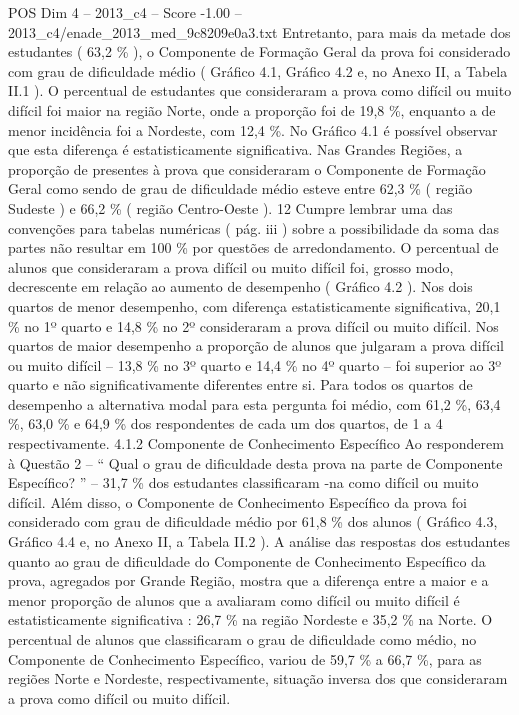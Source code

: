 \begin{textsample}{POS Dim 4 – 2013\_c4 – Score -1.00 – 2013\_c4/enade\_2013\_med\_9c8209e0a3.txt}
Entretanto, para mais da metade dos estudantes ( 63,2 \% ), o Componente de Formação Geral da prova foi considerado com grau de dificuldade médio ( Gráfico 4.1, Gráfico 4.2 e, no Anexo II, a Tabela II.1 ).
O percentual de estudantes que consideraram a prova como difícil ou muito difícil foi maior na região Norte, onde a proporção foi de 19,8 \%, enquanto a de menor incidência foi a Nordeste, com 12,4 \%.
No Gráfico 4.1 é possível observar que esta diferença é estatisticamente significativa.
Nas Grandes Regiões, a proporção de presentes à prova que consideraram o Componente de Formação Geral como sendo de grau de dificuldade médio esteve entre 62,3 \% ( região Sudeste ) e 66,2 \% ( região Centro-Oeste ). 12 Cumpre lembrar uma das convenções para tabelas numéricas ( pág. iii ) sobre a possibilidade da soma das partes não resultar em 100 \% por questões de arredondamento.
O percentual de alunos que consideraram a prova difícil ou muito difícil foi, grosso modo, decrescente em relação ao aumento de desempenho ( Gráfico 4.2 ).
Nos dois quartos de menor desempenho, com diferença estatisticamente significativa, 20,1 \% no 1º quarto e 14,8 \% no 2º consideraram a prova difícil ou muito difícil.
Nos quartos de maior desempenho a proporção de alunos que julgaram a prova difícil ou muito difícil – 13,8 \% no 3º quarto e 14,4 \% no 4º quarto – foi superior ao 3º quarto e não significativamente diferentes entre si.
Para todos os quartos de desempenho a alternativa modal para esta pergunta foi médio, com 61,2 \%, 63,4 \%, 63,0 \% e 64,9 \% dos respondentes de cada um dos quartos, de 1 a 4 respectivamente. 4.1.2 Componente de Conhecimento Específico Ao responderem à Questão 2 – “ Qual o grau de dificuldade desta prova na parte de Componente Específico? ” – 31,7 \% dos estudantes classificaram -na como difícil ou muito difícil.
Além disso, o Componente de Conhecimento Específico da prova foi considerado com grau de dificuldade médio por 61,8 \% dos alunos ( Gráfico 4.3, Gráfico 4.4 e, no Anexo II, a Tabela II.2 ).
A análise das respostas dos estudantes quanto ao grau de dificuldade do Componente de Conhecimento Específico da prova, agregados por Grande Região, mostra que a diferença entre a maior e a menor proporção de alunos que a avaliaram como difícil ou muito difícil é estatisticamente significativa : 26,7 \% na região Nordeste e 35,2 \% na Norte.
O percentual de alunos que classificaram o grau de dificuldade como médio, no Componente de Conhecimento Específico, variou de 59,7 \% a 66,7 \%, para as regiões Norte e Nordeste, respectivamente, situação inversa dos que consideraram a prova como difícil ou muito difícil.

\end{textsample}
